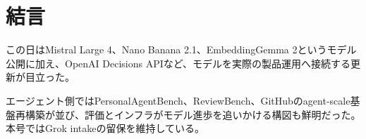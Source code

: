 \section*{結言}
この日はMistral Large 4、Nano Banana 2.1、EmbeddingGemma 2というモデル公開に加え、OpenAI Decisions APIなど、モデルを実際の製品運用へ接続する更新が目立った。

エージェント側ではPersonalAgentBench、ReviewBench、GitHubのagent-scale基盤再構築が並び、評価とインフラがモデル進歩を追いかける構図も鮮明だった。本号ではGrok intakeの留保を維持している。
